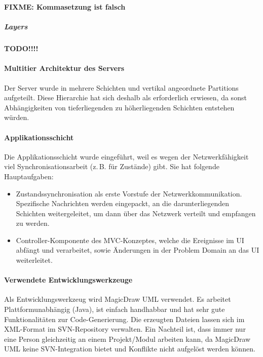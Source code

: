\documentclass[12pt,halfparskip]{scrartcl}
\begin{document}
\textbf{FIXME: Kommasetzung ist falsch}


\subparagraph{Layers} %
\label{ssub:layers}
\textbf{TODO!!!!}


\paragraph{Multitier Architektur des Servers}\label{ssub:multitier_architektur_des_servers} %
Der Server wurde in mehrere Schichten und vertikal angeordnete Partitions aufgeteilt. Diese Hierarchie hat sich deshalb als erforderlich erwiesen, da sonst Abhängigkeiten von tieferliegenden zu höherliegenden Schichten entstehen würden.
\paragraph{Applikationsschicht}\label{ssub:applikationsschicht} %
Die Applikationsschicht wurde eingeführt, weil es wegen der Netzwerkfähigkeit viel Synchronisationsarbeit (z.\,B. für Zustände) gibt. Sie hat folgende Hauptaufgaben:
	\begin{itemize}
		\item Zustandssynchronisation als erste Vorstufe der Netzwerkkommunikation. Spezifische Nachrichten werden eingepackt, an die darunterliegenden Schichten weitergeleitet, um dann über das Netzwerk verteilt und empfangen zu werden.
		\item Controller-Komponente des MVC-Konzeptes, welche die Ereignisse im UI abfängt und verarbeitet, sowie Änderungen in der Problem Domain an das UI weiterleitet.
	\end{itemize}
\paragraph{Verwendete Entwicklungswerkzeuge}\label{ssub:verwendete_entwicklungswerkzeuge} %
Als Entwicklungswerkzeug wird MagicDraw UML verwendet. Es arbeitet Plattformunabhängig (Java), ist einfach handhabbar und hat sehr gute Funktionalitäten zur Code-Generierung. Die erzeugten Dateien lassen sich im XML-Format im SVN-Repository verwalten. Ein Nachteil ist, dass immer nur eine Person gleichzeitig an einem Projekt/Modul arbeiten kann, da MagicDraw UML keine SVN-Integration bietet und Konflikte nicht aufgelöst werden können.
\end{document}

